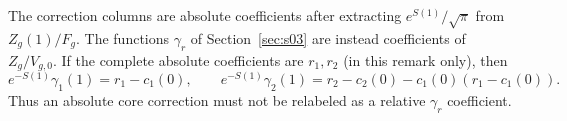 \begin{rmk}[Normalization]
The correction columns are absolute coefficients after extracting
$e^{S(1)}/\sqrt\pi$ from $Z_g(1)/F_g$. The functions $\gamma_r$ of
Section~\ref{sec:s03} are instead coefficients of $Z_g/V_{g,0}$.
If the complete absolute coefficients are $r_1,r_2$ (in this remark
only), then
\[
 e^{-S(1)}\gamma_1(1)=r_1-c_1(0),\qquad
 e^{-S(1)}\gamma_2(1)=r_2-c_2(0)-c_1(0)(r_1-c_1(0)).
\]
Thus an absolute core correction must not be relabeled as a relative
$\gamma_r$ coefficient.
\end{rmk}

